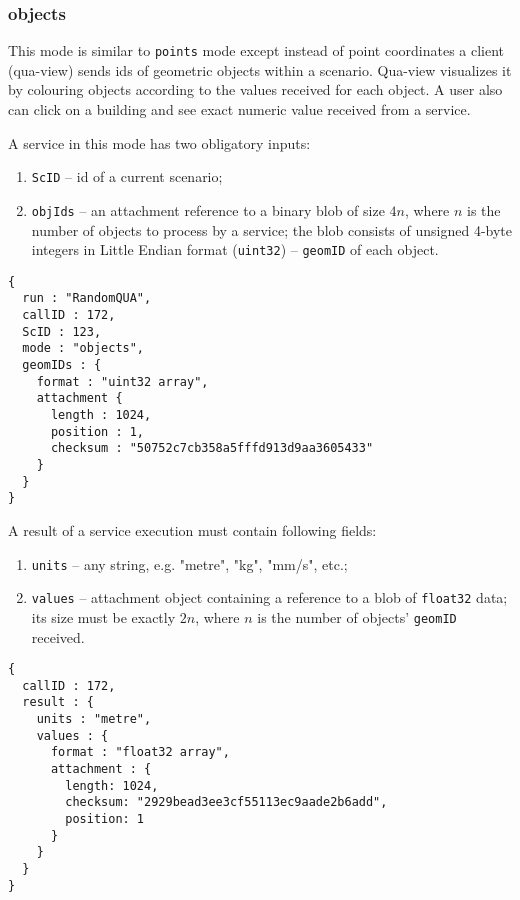 \subsubsection{objects}

This mode is similar to \texttt{points} mode except instead of point coordinates a client (qua-view) sends ids of geometric objects
within a scenario.
Qua-view visualizes it by colouring objects according to the values received for each object.
A user also can click on a building and see exact numeric value received from a service.

A service in this mode has two obligatory inputs:
\begin{enumerate}
\item \texttt{ScID} -- id of a current scenario;
\item \texttt{objIds} -- an attachment reference to a binary blob of size $4n$, where $n$ is the number of objects to process by a service;
                         the blob consists of unsigned 4-byte integers in Little Endian format (\texttt{uint32}) -- \texttt{geomID} of each object.
\end{enumerate}
\begin{lstlisting}[caption={A qua-compliant service run request for mode \texttt{objects}}, label={lst:quacompliantinput:objects}]
{
  run : "RandomQUA",
  callID : 172,
  ScID : 123,
  mode : "objects",
  geomIDs : {
    format : "uint32 array",
    attachment {
      length : 1024,
      position : 1,
      checksum : "50752c7cb358a5fffd913d9aa3605433"
    }
  }
}
\end{lstlisting}

A result of a service execution must contain following fields:
\begin{enumerate}
\item \texttt{units} -- any string, e.g. "metre", "kg", "mm/s", etc.;
\item \texttt{values} -- attachment object containing a reference to a blob of \texttt{float32} data;
 its size must be exactly $2 n$, where $n$ is the number of objects' \texttt{geomID} received.
\end{enumerate}
\begin{lstlisting}[caption={A qua-compliant service output for mode \texttt{objects}}, label={lst:quacompliantresult:objects}]
{
  callID : 172,
  result : {
    units : "metre",
    values : {
      format : "float32 array",
      attachment : {
        length: 1024,
        checksum: "2929bead3ee3cf55113ec9aade2b6add",
        position: 1
      }
    }
  }
}
\end{lstlisting}

